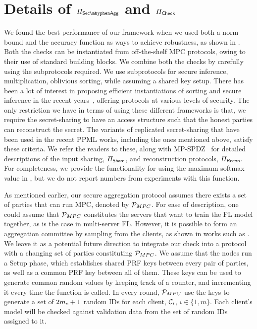 \section{Details of $\PSecAgg$ and $\Pi_{\mathsf{Check}}$}
\label{app:mpcdetails}
We found the best performance of our framework when we used both a norm bound and the accuracy function as ways to achieve robustness, as shown in . 
Both the checks can be instantiated from off-the-shelf MPC protocols, owing to their use of standard building blocks. We combine both the checks by carefully using the subprotocols required. We use subprotocols for secure inference, multiplication, oblivious sorting, while assuming a shared key setup. There has been a lot of interest in proposing efficient instantiations of sorting and secure inference in the recent years~\cite{CCS:AFOPRT21,ruffle,tetrad,CCS:MohRin18,USENIX:DalEscKel21,EPRINT:KelSun22}, offering protocols at various levels of security. The only restriction we have in terms of using these different frameworks is that, we require the secret-sharing to have an access structure such that the honest parties can reconstruct the secret. The variants of replicated secret-sharing \cite{EPRINT:FLNW16} that have been used in the recent PPML works, including the ones mentioned above, satisfy these criteria. We refer the readers to these, along with MP-SPDZ~\cite{EPRINT:Keller20} for detailed descriptions of the input sharing, $\Pi_{\mathsf{Share}}$, and reconstruction protocols, $\Pi_{\mathsf{Recon}}$. For completeness, we provide the functionality for using the maximum softmax value in , but we do not report numbers from experiments with this function.

As mentioned earlier, our secure aggregation protocol assumes there exists a set of parties that can run MPC, denoted by $\mathcal{P}_{MPC}$. For ease of description, one could assume that $\mathcal{P}_{MPC}$ constitutes the servers that want to train the FL model together, as is the case in multi-server FL. However, it is possible to form an aggregation committee by sampling from the clients, as shown in works such as \cite{SP:MWAPR23,CCS:BBGLR20}. We leave it as a potential future direction to integrate our check into a protocol with a changing set of parties constituting $\mathcal{P}_{MPC}$. 
We assume that the nodes run a Setup phase, which establishes shared PRF keys between every pair of parties, as well as a common PRF key between all of them. These keys can be used to generate common random values by keeping track of a counter, and incrementing it every time the function is called. In every round, $\mathcal{P}_{MPC}$ use the keys to generate a set of $2 m_c + 1$ random IDs for each client, $\mathcal{C}_i$, $i \in \{1, m\}$. Each client's model will be checked against validation data from the set of random IDs assigned to it.

